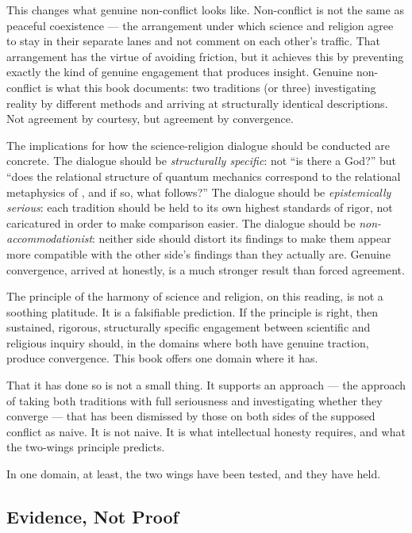 This changes what genuine non-conflict looks like.  Non-conflict is not the same
as peaceful coexistence --- the arrangement under which science and religion agree
to stay in their separate lanes and not comment on each other's traffic.  That
arrangement has the virtue of avoiding friction, but it achieves this by
preventing exactly the kind of genuine engagement that produces insight.  Genuine
non-conflict is what this book documents: two traditions (or three) investigating
reality by different methods and arriving at structurally identical descriptions.
Not agreement by courtesy, but agreement by convergence.

The implications for how the science-religion dialogue should be conducted are
concrete.  The dialogue should be \emph{structurally specific}: not ``is there
a God?'' but ``does the relational structure of quantum mechanics correspond to
the relational metaphysics of \mahabbat, and if so, what follows?''  The dialogue
should be \emph{epistemically serious}: each tradition should be held to its own
highest standards of rigor, not caricatured in order to make comparison easier.
The dialogue should be \emph{non-accommodationist}: neither side should distort
its findings to make them appear more compatible with the other side's findings
than they actually are.  Genuine convergence, arrived at honestly, is a much
stronger result than forced agreement.

The \bahai principle of the harmony of science and religion, on this reading, is
not a soothing platitude.  It is a falsifiable prediction.  If the principle is
right, then sustained, rigorous, structurally specific engagement between
scientific and religious inquiry should, in the domains where both have genuine
traction, produce convergence.  This book offers one domain where it has.

That it has done so is not a small thing.  It supports an approach --- the
approach of taking both traditions with full seriousness and investigating whether
they converge --- that has been dismissed by those on both sides of the supposed
conflict as naive.  It is not naive.  It is what intellectual honesty requires,
and what the two-wings principle predicts.

In one domain, at least, the two wings have been tested, and they have held.

\subsection*{Evidence, Not Proof}

